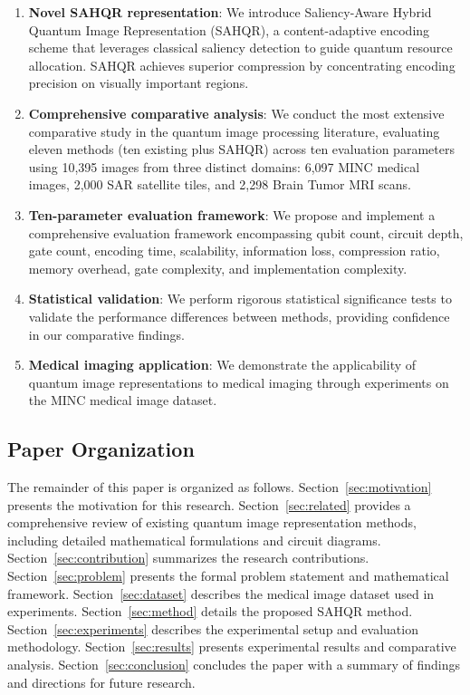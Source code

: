 \documentclass{ipol}
\begin{document}
\begin{enumerate}
\item \textbf{Novel SAHQR representation}: We introduce Saliency-Aware Hybrid Quantum Image Representation (SAHQR), a content-adaptive encoding scheme that leverages classical saliency detection to guide quantum resource allocation. SAHQR achieves superior compression by concentrating encoding precision on visually important regions.

\item \textbf{Comprehensive comparative analysis}: We conduct the most extensive comparative study in the quantum image processing literature, evaluating eleven methods (ten existing plus SAHQR) across ten evaluation parameters using 10,395 images from three distinct domains: 6,097 MINC medical images, 2,000 SAR satellite tiles, and 2,298 Brain Tumor MRI scans.

\item \textbf{Ten-parameter evaluation framework}: We propose and implement a comprehensive evaluation framework encompassing qubit count, circuit depth, gate count, encoding time, scalability, information loss, compression ratio, memory overhead, gate complexity, and implementation complexity.

\item \textbf{Statistical validation}: We perform rigorous statistical significance tests to validate the performance differences between methods, providing confidence in our comparative findings.

\item \textbf{Medical imaging application}: We demonstrate the applicability of quantum image representations to medical imaging through experiments on the MINC medical image dataset.
\end{enumerate}

\subsection{Paper Organization}

The remainder of this paper is organized as follows. Section~\ref{sec:motivation} presents the motivation for this research. Section~\ref{sec:related} provides a comprehensive review of existing quantum image representation methods, including detailed mathematical formulations and circuit diagrams. Section~\ref{sec:contribution} summarizes the research contributions. Section~\ref{sec:problem} presents the formal problem statement and mathematical framework. Section~\ref{sec:dataset} describes the medical image dataset used in experiments. Section~\ref{sec:method} details the proposed SAHQR method. Section~\ref{sec:experiments} describes the experimental setup and evaluation methodology. Section~\ref{sec:results} presents experimental results and comparative analysis. Section~\ref{sec:conclusion} concludes the paper with a summary of findings and directions for future research.
\end{document}
